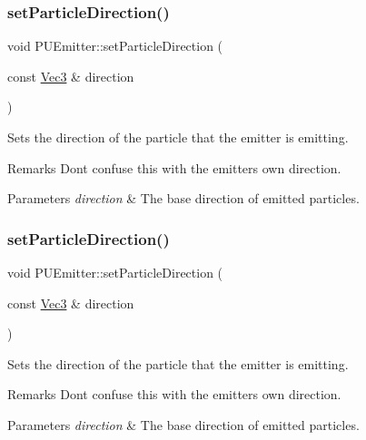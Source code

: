 \subsubsection{\texorpdfstring{set\+Particle\+Direction()}{setParticleDirection()}\hspace{0.1cm}{\footnotesize\ttfamily [1/2]}}
{\footnotesize\ttfamily void P\+U\+Emitter\+::set\+Particle\+Direction (\begin{DoxyParamCaption}\item[{const \hyperlink{classVec3}{Vec3} \&}]{direction }\end{DoxyParamCaption})}

Sets the direction of the particle that the emitter is emitting. \begin{DoxyRemark}{Remarks}
Don\textquotesingle{}t confuse this with the emitters own direction. 
\end{DoxyRemark}

\begin{DoxyParams}{Parameters}
{\em direction} & The base direction of emitted particles. \\
\hline
\end{DoxyParams}
\mbox{\label{classPUEmitter_a999914161830d3b6cc2cbb6833f196af}} 
\subsubsection{\texorpdfstring{set\+Particle\+Direction()}{setParticleDirection()}\hspace{0.1cm}{\footnotesize\ttfamily [2/2]}}
{\footnotesize\ttfamily void P\+U\+Emitter\+::set\+Particle\+Direction (\begin{DoxyParamCaption}\item[{const \hyperlink{classVec3}{Vec3} \&}]{direction }\end{DoxyParamCaption})}

Sets the direction of the particle that the emitter is emitting. \begin{DoxyRemark}{Remarks}
Don\textquotesingle{}t confuse this with the emitters own direction. 
\end{DoxyRemark}

\begin{DoxyParams}{Parameters}
{\em direction} & The base direction of emitted particles. \\
\hline
\end{DoxyParams}
\mbox{\label{classPUEmitter_ab71781433c3f2547008a71de464d615a}} 
